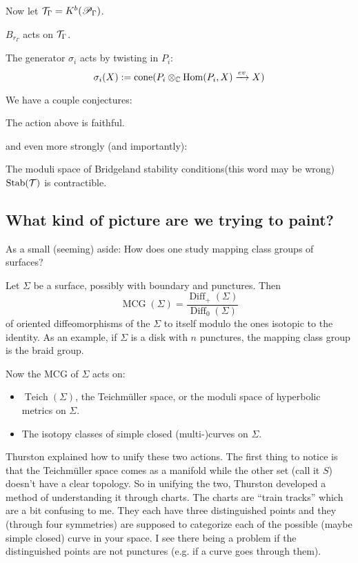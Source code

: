 \documentclass[12pt]{article}
\begin{document}
Now let $\mathcal{T}_\Gamma=K^b(\mathscr{P}_\Gamma)$. 
\begin{thm}
	$B_{r_\Gamma}$ acts on $\mathcal{T}_\Gamma$.

	The generator $\sigma_i$ acts by twisting in $P_i$:
	\[\sigma_i(X):=\operatorname{cone}(P_i\otimes_{\mathbb{C}} \operatorname{Hom}(P_i,X)\xrightarrow{ev}X)\]
\end{thm}

We have a couple conjectures:
\begin{conj}
	The action above is faithful.
\end{conj}
and even more strongly (and importantly):
\begin{conj}
	The moduli space of Bridgeland stability conditions(this word may be wrong) $\operatorname{Stab}(\mathcal{T})$ is contractible.
\end{conj}

\subsection{What kind of picture are we trying to paint?}
As a small (seeming) aside: How does one study mapping class groups of surfaces?

Let $\Sigma$ be a surface, possibly with boundary and punctures. Then 
\[\operatorname{MCG}(\Sigma)=\frac{\operatorname{Diff}_+(\Sigma)}{\operatorname{Diff}_0(\Sigma)}\]
of oriented diffeomorphisms of the $\Sigma$ to itself modulo the ones isotopic to the identity. As an example, if $\Sigma$ is a disk with 
$n$ punctures, the mapping class group is the braid group.

Now the MCG of $\Sigma$ acts on:
\begin{itemize}
	\item $\operatorname{Teich}(\Sigma)$, the Teichm\"uller space, or the moduli space of hyperbolic metrics on $\Sigma.$
	\item The isotopy classes of simple closed (multi-)curves on $\Sigma$.
\end{itemize} 

Thurston explained how to unify these two actions. The first thing to notice is that the Teichm\"uller space comes as a manifold while the other set (call it $S$)
doesn't have a clear topology. So in unifying the two, Thurston developed a method of understanding it through charts. The charts are ``train tracks'' which are a bit confusing to me.
They each have three distinguished points and they (through four symmetries) are supposed to categorize each of the possible (maybe simple closed) curve in your space.
I see there being a problem if the distinguished points are not punctures (e.g. if a curve goes through them).
\end{document}
